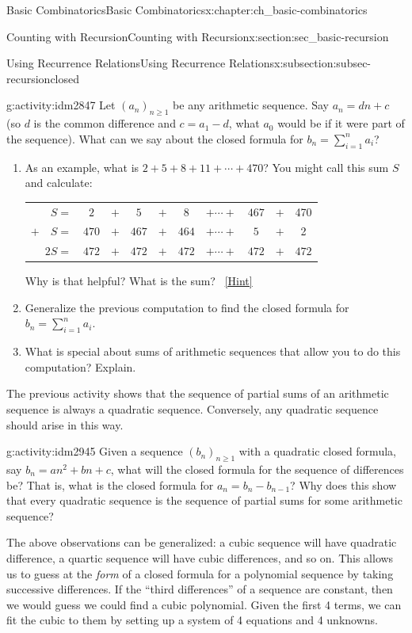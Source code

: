 \documentclass[oneside,10pt,]{book}
\numberwithin{equation}{chapter}
\newcommand{\hrulethin}  {\noalign{\hrule height 0.04em}}
\begin{document}
\begin{chapterptx}{Basic Combinatorics}{}{Basic Combinatorics}{}{}{x:chapter:ch_basic-combinatorics}
\begin{sectionptx}{Counting with Recursion}{}{Counting with Recursion}{}{}{x:section:sec_basic-recursion}
\begin{subsectionptx}{Using Recurrence Relations}{}{Using Recurrence Relations}{}{}{x:subsection:subsec-recursionclosed}
\begin{activity}{}{g:activity:idm2847}%
Let \((a_n)_{n \ge 1}\) be any arithmetic sequence.  Say \(a_n = dn + c\) (so \(d\) is the common difference and \(c = a_1 - d\), what \(a_0\) would be if it were part of the sequence).  What can we say about the closed formula for \(b_n = \sum_{i=1}^n a_i\)?%
\begin{enumerate}[font=\bfseries,label=(\alph*),ref=\alph*]
\item{}As an example, what is \(2+5+8+11+\cdots + 470\)?  You might call this sum \(S\) and calculate:%
\begin{sidebyside}{1}{0}{0}{0}%
\begin{sbspanel}{1}%
{\centering%
\begin{tabular}{rccccccccc}
\(S  =\)&\(2\)&\(+\)&\(5\)&\(+\)&\(8\)&\(+ \cdots +\)&\(467\)&\(+\)&470\tabularnewline[0pt]
\(+ \quad S  =\)&\(470\)&\(+\)&\(467\)&\(+\)&\(464\)&\(+ \cdots +\)&\(5\)&\(+\)&2\tabularnewline\hrulethin
\(2S  =\)&\(472\)&\(+\)&\(472\)&\(+\)&\(472\)&\(+ \cdots +\)&\(472\)&\(+\)&\(472\)
\end{tabular}
\par}
\end{sbspanel}%
\end{sidebyside}%
\par
Why is that helpful?  What is the sum?%
\qquad~\hfill{\tiny\hyperlink{g:hint:idm2935-back}{[Hint]}}\item{}Generalize the previous computation to find the closed formula for \(b_n = \sum_{i=1}^n a_i\).%
\item{}What is special about sums of arithmetic sequences that allow you to do this computation?  Explain.%
\end{enumerate}
\end{activity}
The previous activity shows that the sequence of partial sums of an arithmetic sequence is always a quadratic sequence.  Conversely, any quadratic sequence should arise in this way.%
\begin{activity}{}{g:activity:idm2945}%
Given a sequence \((b_n)_{n \ge 1}\) with a quadratic closed formula, say \(b_n = an^2 + bn + c\), what will the closed formula for the sequence of differences be?  That is, what is the closed formula for \(a_n = b_n - b_{n-1}\)?  Why does this show that every quadratic sequence is the sequence of partial sums for some arithmetic sequence?%
\end{activity}
The above observations can be generalized: a cubic sequence will have quadratic difference, a quartic sequence will have cubic differences, and so on.  This allows us to guess at the \emph{form} of a closed formula for a polynomial sequence by taking successive differences.  If the ``third differences'' of a sequence are constant, then we would guess we could find a cubic polynomial.  Given the first 4 terms, we can fit the cubic to them by setting up a system of 4 equations and 4 unknowns.%

\end{subsectionptx}
\end{sectionptx}
\end{chapterptx}
\end{document}
